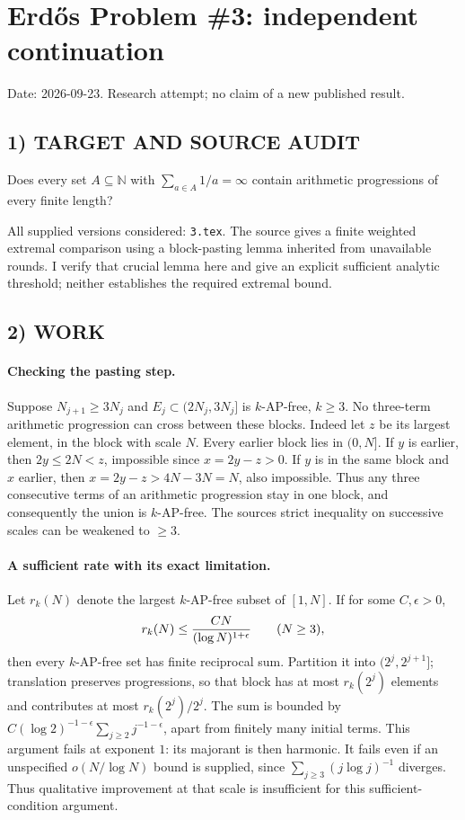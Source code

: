 \section{Erd\H{o}s Problem \#3: independent continuation}
\noindent Date: 2026-09-23. Research attempt; no claim of a new published result.
\subsection{1) TARGET AND SOURCE AUDIT}
Does every set $A\subseteq\mathbb N$ with $\sum_{a\in A}1/a=\infty$ contain arithmetic progressions of every finite length?

All supplied versions considered: \texttt{3.tex}.
The source gives a finite weighted extremal comparison using a block-pasting lemma inherited from unavailable rounds. I verify that crucial lemma here and give an explicit sufficient analytic threshold; neither establishes the required extremal bound.
\subsection{2) WORK}
\paragraph{Checking the pasting step.}
Suppose $N_{j+1}\ge3N_j$ and $E_j\subset(2N_j,3N_j]$ is $k$-AP-free, $k\ge3$. No three-term arithmetic progression can cross between these blocks. Indeed let $z$ be its largest element, in the block with scale $N$. Every earlier block lies in $(0,N]$. If $y$ is earlier, then $2y\le2N<z$, impossible since $x=2y-z>0$. If $y$ is in the same block and $x$ earlier, then $x=2y-z>4N-3N=N$, also impossible. Thus any three consecutive terms of an arithmetic progression stay in one block, and consequently the union is $k$-AP-free. The source\textquotesingle s strict inequality on successive scales can be weakened to $\ge3$.

\paragraph{A sufficient rate with its exact limitation.}
Let $r_k(N)$ denote the largest $k$-AP-free subset of $[1,N]$. If for some $C,\epsilon>0$,
\[
r_k(N)\le {CN\over(\log N)^{1+\epsilon}}\qquad(N\ge3),
\]
then every $k$-AP-free set has finite reciprocal sum. Partition it into $(2^j,2^{j+1}]$; translation preserves progressions, so that block has at most $r_k(2^j)$ elements and contributes at most $r_k(2^j)/2^j$. The sum is bounded by $C(\log2)^{-1-\epsilon}\sum_{j\ge2}j^{-1-\epsilon}$, apart from finitely many initial terms.
This argument fails at exponent $1$: its majorant is then harmonic. It fails even if an unspecified $o(N/\log N)$ bound is supplied, since $\sum_{j\ge3}(j\log j)^{-1}$ diverges. Thus qualitative improvement at that scale is insufficient for this sufficient-condition argument.
